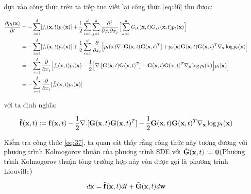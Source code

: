 \documentclass{article} %
\begin{document}
dựa vào công thức trên ta tiếp tục viết lại công thức \ref{eq:36} thu được:

\begin{equation} \label{eq:37}
    \begin{aligned}
        \dfrac{\partial p_t (\bold{x})}{\partial t} &= - \sum_{i=1}^d \lbrack f_i (\bold{x}, t) p_t(\bold{x}) \rbrack + \dfrac{1}{2} \sum_{i=1}^d \sum_{j=1}^d \dfrac{\partial^2}{\partial x_i \partial x_j} \Big \lbrack \sum_{k=1}^d G_{ik} (\bold{x}, t) G_{jk}(\bold{x}, t) p_t (\bold{x}) \Big \rbrack \\
        &= - \sum_{i=1}^d \lbrack f_i (\bold{x}, t) p_t(\bold{x}) \rbrack + \dfrac{1}{2} \sum_{i=1}^d \dfrac{\partial}{\partial x_i} \Big \lbrack p_t(\bold{x}) \nabla . \lbrack \bold{G}(\bold{x}, t) \bold{G}(\bold{x}, t)^T \rbrack + p_t(\bold{x}) \bold{G}(\bold{x}, t) \bold{G}(\bold{x}, t)^T \nabla_{\bold{x}} \log p_t (\bold{x}) \Big \rbrack \\
        &= -\sum_{i=1}^d \dfrac{\partial}{\partial x_i} \Big \lbrack f_i(\bold{x}, t) p_t(\bold{x}) - \dfrac{1}{2} \Big \lbrack \nabla . \lbrack \bold{G}(\bold{x}, t) \bold{G}(\bold{x}, t)^T \rbrack + \bold{G}(\bold{x}, t) \bold{G}(\bold{x}, t)^T \nabla_{\bold{x}} \log p_t(\bold{x})  \Big \rbrack p_t(\bold{x}) \Big \rbrack \\
        &= - \sum_{i=1}^d \dfrac{\partial}{\partial x_i} \lbrack \tilde{f}_i (\bold{x}, t) p_t(\bold{x}) \rbrack
    \end{aligned}
\end{equation}

với ta định nghĩa:

\begin{equation*}
    \tilde{\bold{f}}(\bold{x}, t) := \bold{f}(\bold{x}, t) - \dfrac{1}{2} \nabla . \lbrack \bold{G}(\bold{x}, t) \bold{G}(\bold{x}, t)^T \rbrack - \dfrac{1}{2} \bold{G}(\bold{x}, t) \bold{G}(\bold{x}, t)^T \nabla_{\bold{x}} \log p_t(\bold{x})
\end{equation*}

Kiểm tra công thức \ref{eq:37}, ta quan sát thấy rằng công thức này tương đương với phương trình Kolmogorov thuận của phương trình SDE với $\tilde{\bold{G}} (\bold{x}, t) := \bold{0}$(Phương trình Kolmogorov thuận tỏng trường hợp này còn được gọi là phương trình Liouville)

\begin{equation*}
    d \bold{x} = \tilde{\bold{f}} (\bold{x}, t) dt + \tilde{\bold{G}}(\bold{x}, t) d \bold{w}
\end{equation*}
\end{document}

